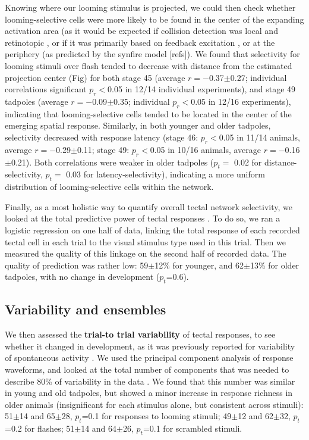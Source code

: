 \documentclass{article}
\begin{document}
Knowing where our looming stimulus is projected, we could then check whether looming-selective cells were more likely to be found in the center of the expanding activation area (as it would be expected if collision detection was local and retinotopic \citep{frost2004review}, or if it was primarily based on feedback excitation \citep{jang2016}, or at the periphery (as predicted by the synfire model [refs]). We found that selectivity for looming stimuli over flash tended to decrease with distance from the estimated projection center (Fig) for both stage 45 (average $r=-$0.37$\pm$0.27; individual correlations significant $p_r<$0.05 in 12/14 individual experiments), and stage 49 tadpoles (average $r=-$0.09$\pm$0.35; individual $p_r<$0.05 in 12/16 experiments), indicating that looming-selective cells tended to be located in the center of the emerging spatial response. Similarly, in both younger and older tadpoles, selectivity decreased with response latency (stage 46: $p_r<$0.05 in 11/14 animals, average $r=-$0.29$\pm$0.11; stage 49: $p_r<$0.05 in 10/16 animals, average $r=-$0.16$\pm$0.21). Both correlations were weaker in older tadpoles ($p_t=$ 0.02 for distance-selectivity, $p_t=$ 0.03 for latency-selectivity), indicating a more uniform distribution of looming-selective cells within the network.

Finally, as a most holistic way to quantify overall tectal network selectivity, we looked at the total predictive power of tectal responses \citep{avitan2016limitations}. To do so, we ran a logistic regression on one half of data, linking the total response of each recorded tectal cell in each trial to the visual stimulus type used in this trial. Then we measured the quality of this linkage on the second half of recorded data. The quality of prediction was rather low: 59$\pm$12\% for younger, and 62$\pm$13\% for older tadpoles, with no change in development ($p_t$=0.6).

\subsection*{Variability and ensembles}

We then assessed the \textbf{trial-to trial variability} of tectal responses, to see whether it changed in development, as it was previously reported for variability of spontaneous activity \citep{xu2011,avitan2017spontaneous}. We used the principal component analysis of response waveforms, and looked at the total number of components that was needed to describe 80\% of variability in the data \citep{avitan2017spontaneous}. We found that this number was similar in young and old tadpoles, but showed a minor increase in response richness in older animals (insignificant for each stimulus alone, but consistent across stimuli): 51$\pm$14 and 65$\pm$28, $p_t$=0.1 for responses to looming stimuli; 49$\pm$12 and 62$\pm$32, $p_t$=0.2 for flashes; 51$\pm$14 and 64$\pm$26, $p_t$=0.1 for scrambled stimuli.
\end{document}
